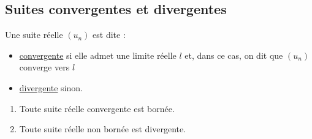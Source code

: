 \subsection{Suites convergentes et divergentes}

\begin{defi}
    Une suite réelle \((u_n)\) est dite : 
    \begin{itemize}
        \item \underline{convergente} si elle admet une limite réelle \(l\) et, dans ce cas, on dit que \((u_n)\) converge vers \(l\)
        \item \underline{divergente} sinon.
    \end{itemize}
\end{defi}

\begin{prop}
    \begin{enumerate}
        \item Toute suite réelle convergente est bornée. \\
        \item Toute suite réelle non bornée est divergente.
    \end{enumerate}
\end{prop}

